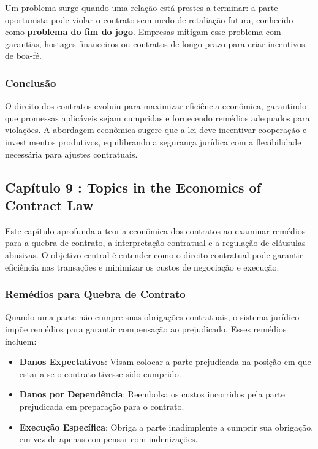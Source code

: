 \documentclass[a4paper,12pt]{article}[abntex2]
\begin{document}
Um problema surge quando uma relação está prestes a terminar: a parte oportunista pode violar o contrato sem medo de retaliação futura, conhecido como \textbf{problema do fim do jogo}. Empresas mitigam esse problema com garantias, hostages financeiros ou contratos de longo prazo para criar incentivos de boa-fé.

\subsubsection{Conclusão}

O direito dos contratos evoluiu para maximizar eficiência econômica, garantindo que promessas aplicáveis sejam cumpridas e fornecendo remédios adequados para violações. A abordagem econômica sugere que a lei deve incentivar cooperação e investimentos produtivos, equilibrando a segurança jurídica com a flexibilidade necessária para ajustes contratuais.

\subsection{\textbf{Capítulo 9 : Topics in the Economics of Contract Law}}

Este capítulo aprofunda a teoria econômica dos contratos ao examinar remédios para a quebra de contrato, a interpretação contratual e a regulação de cláusulas abusivas. O objetivo central é entender como o direito contratual pode garantir eficiência nas transações e minimizar os custos de negociação e execução.

\subsubsection{Remédios para Quebra de Contrato}

Quando uma parte não cumpre suas obrigações contratuais, o sistema jurídico impõe remédios para garantir compensação ao prejudicado. Esses remédios incluem:
\begin{itemize}
    \item \textbf{Danos Expectativos}: Visam colocar a parte prejudicada na posição em que estaria se o contrato tivesse sido cumprido.
    \item \textbf{Danos por Dependência}: Reembolsa os custos incorridos pela parte prejudicada em preparação para o contrato.
    \item \textbf{Execução Específica}: Obriga a parte inadimplente a cumprir sua obrigação, em vez de apenas compensar com indenizações.
\end{itemize}
\end{document}
